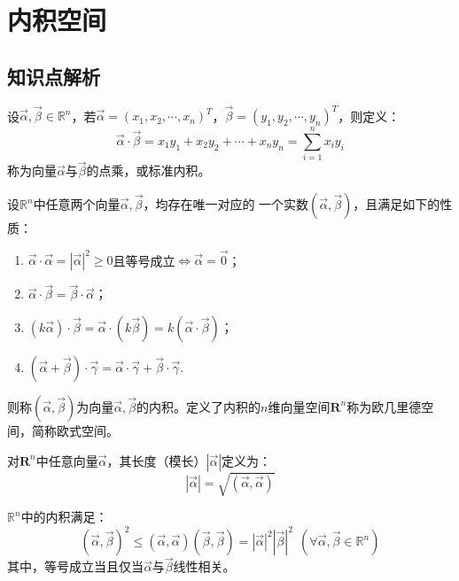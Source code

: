 \chapter{内积空间}

\section{知识点解析}
\begin{Def}
设$\vec{\alpha},\vec{\beta}\in\mathbb{R}^n$，若$\vec{\alpha}=(x_1,x_2,\cdots,x_n)^{T}$，$\vec{\beta}=(y_1,y_2,\cdots,y_n)^{T}$，则定义：
\begin{equation*}
\vec{\alpha}\cdot\vec{\beta}=x_1y_1+x_2y_2+\cdots+x_ny_n=\sum_{i=1}^{n}x_iy_i
\end{equation*}
称为向量$\vec{\alpha}$与$\vec{\beta}$的点乘，或标准内积。
\end{Def}

\begin{Def}\label{neiji}
设$\mathbb{R}^{n}$中任意两个向量$\vec{\alpha},\vec{\beta}$，均存在唯一对应的
一个实数$(\vec{\alpha},\vec{\beta})$，且满足如下的性质：
\begin{enumerate}
  \item $\vec{\alpha}\cdot\vec{\alpha}=|\vec{\alpha}|^2\geq0$且等号成立$\Leftrightarrow\vec{\alpha}=\vec{0}$；
  \item $\vec{\alpha}\cdot\vec{\beta}=\vec{\beta}\cdot\vec{\alpha}$；
  \item $(k\vec{\alpha})\cdot\vec{\beta}=\vec{\alpha}\cdot(k\vec{\beta})
        =k(\vec{\alpha}\cdot\vec{\beta})$；
  \item $(\vec{\alpha}+\vec{\beta})\cdot\vec{\gamma}=\vec{\alpha}
        \cdot\vec{\gamma}+\vec{\beta}\cdot\vec{\gamma}$.
\end{enumerate}
则称$(\vec{\alpha},\vec{\beta})$为向量$\vec{\alpha},\vec{\beta}$的内积。定义了内积的$n$维向量空间$\mathbf{R}^n$称为欧几里德空间，简称欧式空间。
\end{Def}

\begin{Def}
对$\mathbf{R}^n$中任意向量$\vec{\alpha}$，其长度（模长）$|\vec{\alpha}|$定义为：
\begin{equation*}
|\vec{\alpha}|=\sqrt{(\vec{\alpha},\vec{\alpha})}
\end{equation*}
\end{Def}

\begin{thm}
$\mathbb{R}^n$中的内积满足：
\begin{equation*}
(\vec{\alpha},\vec{\beta})^2\leq(\vec{\alpha},\vec{\alpha})
(\vec{\beta},\vec{\beta})=|\vec{\alpha}|^2|\vec{\beta}|^2~~
(\forall\vec{\alpha},\vec{\beta}\in\mathbb{R}^n)
\end{equation*}
其中，等号成立当且仅当$\vec{\alpha}$与$\vec{\beta}$线性相关。
\end{thm}

